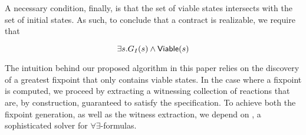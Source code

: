 A necessary condition, finally, is that the set of viable states
intersects with the set of initial states. As such, to conclude that a contract
is realizable, we require that

\begin{equation}
\exists s. G_I(s) \land {\mathsf {Viable}}(s)
\label{eq:nonempty}
\end{equation}

The intuition behind our proposed algorithm in this paper relies on the
discovery of a greatest fixpoint that only contains viable states. In the case where a fixpoint is computed, we proceed by extracting a witnessing collection of reactions that are, by construction, guaranteed to satisfy the specification. To achieve both the fixpoint generation, as well as the witness extraction, we depend on \aeval, a sophisticated solver for $\forall\exists$-formulas.


